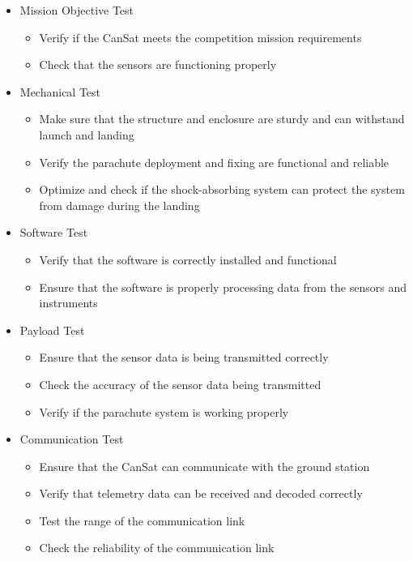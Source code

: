 \documentclass[11pt]{article}
\begin{document}
\begin{itemize}[leftmargin=1cm, itemindent=0.25cm, noitemsep, topsep=0pt, label=]
\item Mission Objective Test
\begin{itemize}[label=, noitemsep, topsep=2pt]
\item Verify if the CanSat meets the competition mission requirements
\item Check that the sensors are functioning properly
\end{itemize}

\item Mechanical Test
\begin{itemize}[label=, noitemsep, topsep=2pt]
\item Make sure that the structure and enclosure are sturdy and can withstand launch and landing
\item Verify the parachute deployment and fixing are functional and reliable
\item Optimize and check if the shock-absorbing system can protect the system from damage during the landing
\end{itemize}

\item Software Test
\begin{itemize}[label=, noitemsep, topsep=2pt]
\item Verify that the software is correctly installed and functional
\item Ensure that the software is properly processing data from the sensors and instruments
\end{itemize}

\item Payload Test
\begin{itemize}[label=, noitemsep, topsep=2pt]
\item Ensure that the sensor data is being transmitted correctly
\item Check the accuracy of the sensor data being transmitted
\item Verify if the parachute system is working properly
\end{itemize}

\item Communication Test
\begin{itemize}[label=, noitemsep, topsep=2pt]
\item Ensure that the CanSat can communicate with the ground station
\item Verify that telemetry data can be received and decoded correctly
\item Test the range of the communication link
\item Check the reliability of the communication link
\end{itemize}


\end{itemize}
\end{document}
